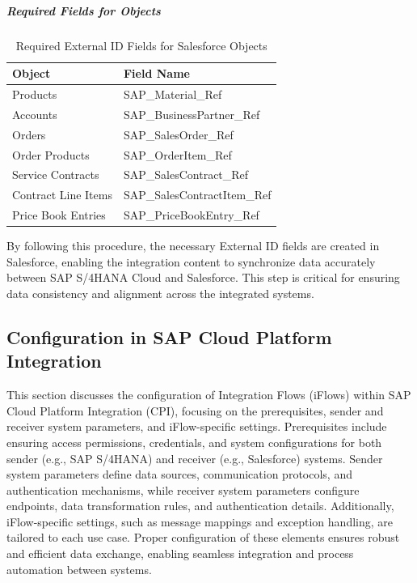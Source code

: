 \subparagraph{Required Fields for Objects}
\begin{table}[h!]
    \centering
    \begin{tabular}{|l|l|}
        \hline
        \textbf{Object}          & \textbf{Field Name}              \\ \hline
        Products                  & SAP\_Material\_Ref               \\ \hline
        Accounts                  & SAP\_BusinessPartner\_Ref        \\ \hline
        Orders                    & SAP\_SalesOrder\_Ref             \\ \hline
        Order Products            & SAP\_OrderItem\_Ref              \\ \hline
        Service Contracts         & SAP\_SalesContract\_Ref          \\ \hline
        Contract Line Items       & SAP\_SalesContractItem\_Ref      \\ \hline
        Price Book Entries        & SAP\_PriceBookEntry\_Ref         \\ \hline
    \end{tabular}
    \caption{Required External ID Fields for Salesforce Objects}
    \label{tab:external_ids}
\end{table}

By following this procedure, the necessary External ID fields are created in Salesforce, enabling the integration content to synchronize data accurately between SAP S/4HANA Cloud and Salesforce. This step is critical for ensuring data consistency and alignment across the integrated systems.


\subsection{Configuration in SAP Cloud Platform Integration }

This section discusses the configuration of Integration Flows (iFlows) within SAP Cloud Platform Integration (CPI), focusing on the prerequisites, sender and receiver system parameters, and iFlow-specific settings. Prerequisites include ensuring access permissions, credentials, and system configurations for both sender (e.g., SAP S/4HANA) and receiver (e.g., Salesforce) systems. Sender system parameters define data sources, communication protocols, and authentication mechanisms, while receiver system parameters configure endpoints, data transformation rules, and authentication details. Additionally, iFlow-specific settings, such as message mappings and exception handling, are tailored to each use case. Proper configuration of these elements ensures robust and efficient data exchange, enabling seamless integration and process automation between systems.


